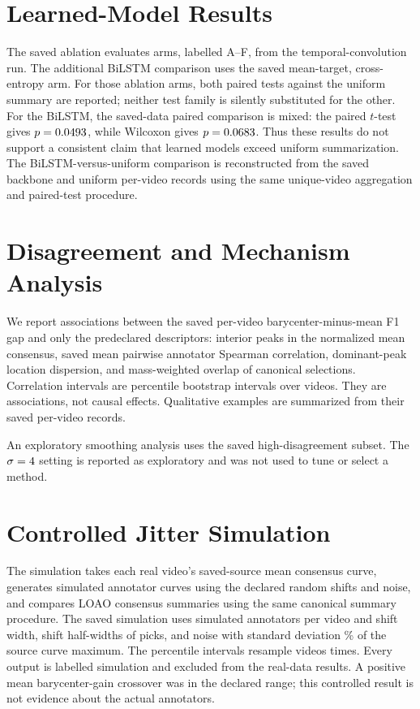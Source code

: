 \documentclass[11pt,a4paper]{article}
\begin{document}
\section{Learned-Model Results}
The saved ablation evaluates \AblationArmCount{} arms, labelled A--F, from the
temporal-convolution run. The additional BiLSTM comparison uses the saved
mean-target, cross-entropy arm. For those ablation arms, both paired tests against the
uniform summary are reported; neither test family is silently substituted
for the other. \AblationUniformFinding{} For the BiLSTM, the saved-data paired
comparison is mixed: the paired $t$-test gives $p=0.0493{}$,
while Wilcoxon gives $p=0.0683{}$. Thus these results do
not support a consistent claim that learned models exceed uniform
summarization. The BiLSTM-versus-uniform comparison is reconstructed from the
saved backbone and uniform per-video records using the same unique-video
aggregation and paired-test procedure.




\section{Disagreement and Mechanism Analysis}
We report associations between the saved per-video barycenter-minus-mean F1
gap and only the predeclared descriptors: interior peaks in the normalized
mean consensus, saved mean pairwise annotator Spearman correlation,
dominant-peak location dispersion, and mass-weighted overlap of canonical
selections. Correlation intervals are percentile bootstrap intervals over
videos. They are associations, not causal effects. Qualitative examples are
summarized from their saved per-video records.



An exploratory smoothing analysis uses the saved high-disagreement subset.
The $\sigma=4{}$ setting is reported as exploratory and was not used to tune or
select a method.


\section{Controlled Jitter Simulation}
The simulation takes each real video's saved-source mean consensus curve,
generates simulated annotator curves using the declared random shifts and
noise, and compares LOAO consensus summaries using the same canonical
summary procedure. The saved simulation uses \SimulationAnnotators{} simulated
annotators per video and shift width, shift half-widths of
\SimulationShiftWidths{} picks, and noise with standard deviation
\SimulationNoisePercent\% of the source curve maximum. The percentile
intervals resample videos \BootstrapReplicates{} times. Every output is
labelled simulation and excluded from the real-data results. A positive mean
barycenter-gain crossover was \SimulationFirstPositiveCrossover{} in the
declared range; this controlled result is not evidence about the actual
annotators.

\end{document}
